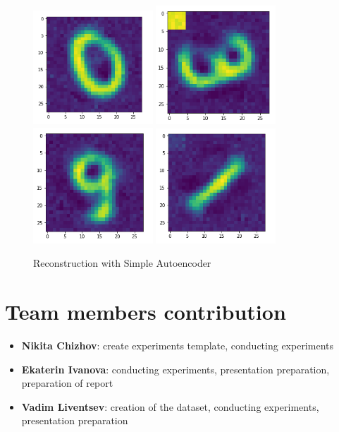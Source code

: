 \documentclass{article}
\begin{document}
\begin{figure}[h]
\centering
\includegraphics[width=0.4\textwidth]{autoenc1.png}
\includegraphics[width=0.4\textwidth]{autoenc2.png}
\includegraphics[width=0.4\textwidth]{autoenc4.png}
\includegraphics[width=0.4\textwidth]{autoenc6.png}
\caption{Reconstruction with Simple Autoencoder}
\label{fig:autorec}
\end{figure}

\section{Team members contribution}
\begin{itemize}
\item \textbf{Nikita Chizhov}: create experiments template, conducting experiments 
\item \textbf{Ekaterin Ivanova}: conducting experiments, presentation preparation, preparation of report
\item \textbf{Vadim Liventsev}: creation of the dataset, conducting experiments, presentation preparation 
\end{itemize}



\end{document}
